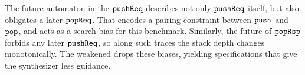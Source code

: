 \vspace{-.35cm}\par{}
\vspace{-.4cm}\par\nobreak\noindent
The future automaton in the $\boldsymbol{{\tt pushReq}}$ \tyName{} describes not only $\boldsymbol{{\tt pushReq}}$ itself, but also obligates a later $\boldsymbol{{\tt popReq}}$. That encodes a pairing constraint between $\boldsymbol{{\tt push}}$ and $\boldsymbol{{\tt pop}}$, and acts as a search bias for this benchmark. Similarly, the future of $\boldsymbol{{\tt popRsp}}$ forbids any later $\boldsymbol{{\tt pushReq}}$, so along such traces the stack depth changes monotonically. The weakened \tyName{} drops these biases, yielding specifications that give the synthesizer less guidance.

\newpage
